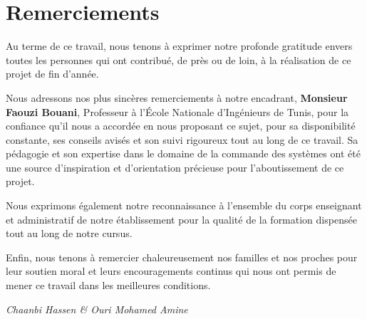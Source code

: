 \chapter*{Remerciements}

\vspace{1cm}

Au terme de ce travail, nous tenons à exprimer notre profonde
gratitude envers toutes les personnes qui ont contribué, de près
ou de loin, à la réalisation de ce projet de fin d'année.

Nous adressons nos plus sincères remerciements à notre encadrant,
\textbf{Monsieur Faouzi Bouani}, Professeur à l'École Nationale
d'Ingénieurs de Tunis, pour la confiance qu'il nous a accordée en
nous proposant ce sujet, pour sa disponibilité constante, ses
conseils avisés et son suivi rigoureux tout au long de ce travail.
Sa pédagogie et son expertise dans le domaine de la commande des
systèmes ont été une source d'inspiration et d'orientation
précieuse pour l'aboutissement de ce projet.

Nous exprimons également notre reconnaissance à l'ensemble du
corps enseignant et administratif de notre établissement pour la
qualité de la formation dispensée tout au long de notre cursus.

Enfin, nous tenons à remercier chaleureusement nos familles et
nos proches pour leur soutien moral et leurs encouragements
continus qui nous ont permis de mener ce travail dans les
meilleures conditions.

\vspace{2cm}

\begin{flushright}
	\textit{Chaanbi Hassen \& Ouri Mohamed Amine}
\end{flushright}